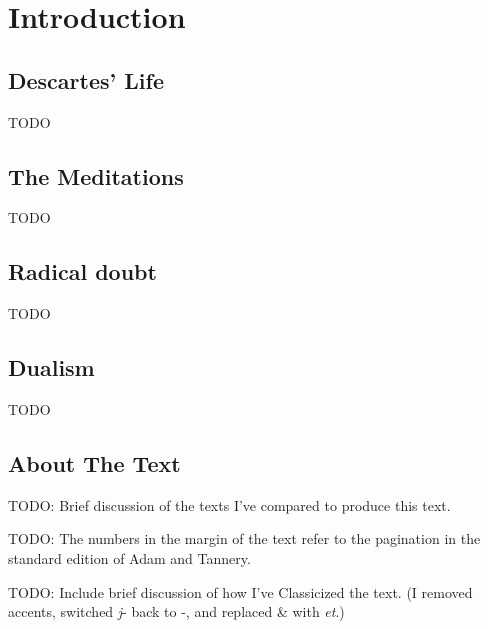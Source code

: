 \chapter*{Introduction}

\section*{Descartes' Life}

TODO

\section*{The Meditations}

TODO

\section*{Radical doubt}

TODO

\section*{Dualism}

TODO

\section*{About The Text}

TODO: Brief discussion of the texts I've compared to produce this text.

TODO: The numbers in the margin of the text refer to the pagination in the standard edition of Adam and Tannery.

TODO: Include brief discussion of how I've Classicized the text. (I removed accents, switched \textit{j}- back to -, and replaced \& with \textit{et}.)

